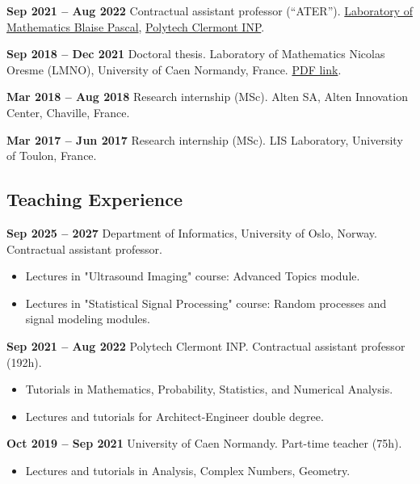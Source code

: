 \documentclass[10pt]{article}
\begin{document}
\medskip

\textbf{Sep 2021 -- Aug 2022} \quad Contractual assistant professor (``ATER'').  
\href{https://lmbp.uca.fr/}{Laboratory of Mathematics Blaise Pascal}, \href{http://polytech.univ-bpclermont.fr/}{Polytech Clermont INP}.  

\medskip

\textbf{Sep 2018 -- Dec 2021} \quad Doctoral thesis.  
Laboratory of Mathematics Nicolas Oresme (LMNO), University of Caen Normandy, France.  
\href{https://tel.archives-ouvertes.fr/tel-03526539}{PDF link}.

\medskip

\textbf{Mar 2018 -- Aug 2018} \quad Research internship (MSc). Alten SA, Alten Innovation Center, Chaville, France.  

\medskip

\textbf{Mar 2017 -- Jun 2017} \quad Research internship (MSc). LIS Laboratory, University of Toulon, France.  

\subsection{Teaching Experience}

\textbf{Sep 2025 -- 2027} \quad Department of Informatics, University of Oslo, Norway.  
Contractual assistant professor. 
\begin{itemize}
  \item Lectures in "Ultrasound Imaging" course: Advanced Topics module.
  \item Lectures in "Statistical Signal Processing" course: Random processes and signal modeling modules.
\end{itemize}


\textbf{Sep 2021 -- Aug 2022} \quad Polytech Clermont INP.  
Contractual assistant professor (192h).  
\begin{itemize}
  \item Tutorials in Mathematics, Probability, Statistics, and Numerical Analysis.
  \item Lectures and tutorials for Architect-Engineer double degree.
\end{itemize}

\textbf{Oct 2019 -- Sep 2021} \quad University of Caen Normandy.  
Part-time teacher (75h).  
\begin{itemize}
  \item Lectures and tutorials in Analysis, Complex Numbers, Geometry.
\end{itemize}
\end{document}
